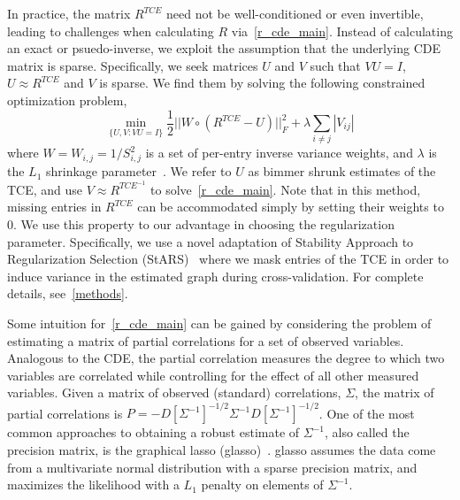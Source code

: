 \documentclass{article}
\begin{document}
In practice, the matrix $R^{TCE}$ need not be well-conditioned or
 even invertible, leading
to challenges when calculating $R$ via~\eqref{r_cde_main}. Instead of calculating an exact
or psuedo-inverse, we exploit the assumption that the underlying
CDE matrix is sparse. Specifically, we seek matrices $U$ and $V$ such that $VU=I$, $U \approx R^{TCE}$ 
and $V$ is sparse. We find them by solving the following constrained optimization problem,
\begin{equation} \label{opt_main}
\min_{\{U, V : VU = I\}} \frac{1}{2} ||W \circ (R^{TCE} - U)||_F^2 +
   \lambda \sum_{i\neq j}|V_{ij}|
\end{equation}
where $W = W_{i,j} = 1/S_{i,j}^2$ is a set of per-entry inverse variance weights,
and $\lambda$ is the $L_1$ shrinkage parameter~\cite{Friedman2007,Tishbirani1996}.
We refer to $U$ as bimmer shrunk estimates of the TCE, and
use $V \approx R^{TCE^{-1}}$ to solve~\eqref{r_cde_main}.
 Note that in this method, missing entries in $R^{TCE}$ can be accommodated simply
by setting their weights to 0. We use this property to our advantage in choosing the
regularization parameter. Specifically, we use a novel adaptation of Stability Approach
to Regularization Selection (StARS)~\cite{Liu2010} where we mask entries of the TCE
in order to induce variance in the estimated graph during cross-validation.
For complete details, see~\ref{methods}.

Some intuition for~\eqref{r_cde_main} can be gained by considering the problem
of estimating a matrix of partial correlations for a set of observed variables.
Analogous to the CDE, the partial correlation measures the degree to which two
variables are correlated while controlling for the effect of all other measured
variables. Given a matrix of observed (standard) correlations, $\Sigma$, the matrix of
partial correlations is $P = -D[\Sigma^{-1}]^{-1/2} \Sigma^{-1} D[\Sigma^{-1}]^{-1/2}$. One of
the most common approaches to obtaining a robust estimate of $\Sigma^{-1}$, also called
the precision matrix, is the graphical lasso (glasso)~\cite{Friedman2007}.
glasso assumes the data come from a multivariate normal distribution with a sparse
precision matrix, and maximizes the likelihood with a $L_1$ penalty on elements of $\Sigma^{-1}$.
\end{document}
